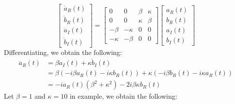             \begin{equation}
                \begin{bmatrix}
                    \dot{a}_{R}(t)\\
                    \dot{b}_{R}(t)\\
                    \dot{a}_{I}(t)\\
                    \dot{b}_{I}(t)
                \end{bmatrix}
                =
                \begin{bmatrix}
                    0&0&\beta&\kappa\\
                    0&0&\kappa&\beta\\
                    -\beta&-\kappa&0&0\\
                    -\kappa&-\beta&0&0
                \end{bmatrix}
                \begin{bmatrix}
                    a_{R}(t)\\
                    b_{R}(t)\\
                    a_{I}(t)\\
                    b_{I}(t)
                \end{bmatrix}
            \end{equation}
            Differentiating, we obtain the following:
            \begin{align*}
                \ddot{a}_{R}(t)&=
                \beta\dot{a}_{I}(t)+\kappa\dot{b}_{I}(t)\\
                &=\beta(-i\beta{a}_{R}(t)-i\kappa{b}_{R}(t))+
                \kappa(-i\beta{b}_{R}(t)-i\kappa{a}_{R}(t))\\
                &=-ia_{R}(t)(\beta^{2}+\kappa^{2})-2i\beta\kappa{b}_{R}(t)
            \end{align*}
            Let $\beta=1$ and $\kappa=10$ in
            example, we obtain the following:
